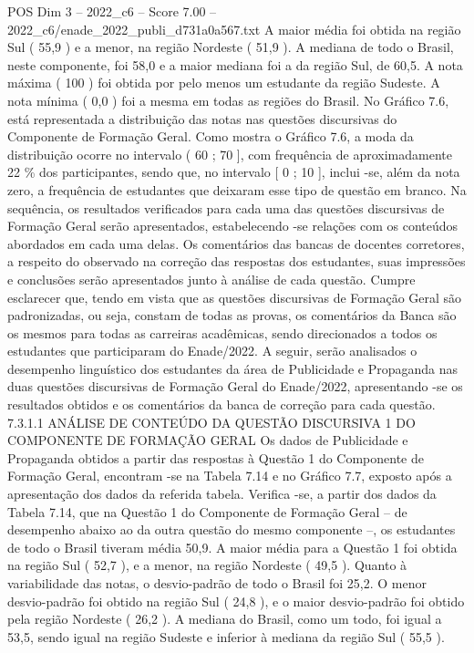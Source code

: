 \begin{textsample}{POS Dim 3 – 2022\_c6 – Score 7.00 – 2022\_c6/enade\_2022\_publi\_d731a0a567.txt}
A maior média foi obtida na região Sul ( 55,9 ) e a menor, na região Nordeste ( 51,9 ).
A mediana de todo o Brasil, neste componente, foi 58,0 e a maior mediana foi a da região Sul, de 60,5.
A nota máxima ( 100 ) foi obtida por pelo menos um estudante da região Sudeste.
A nota mínima ( 0,0 ) foi a mesma em todas as regiões do Brasil.
No Gráfico 7.6, está representada a distribuição das notas nas questões discursivas do Componente de Formação Geral.
Como mostra o Gráfico 7.6, a moda da distribuição ocorre no intervalo ( 60 ; 70 ], com frequência de aproximadamente 22 \% dos participantes, sendo que, no intervalo [ 0 ; 10 ], inclui -se, além da nota zero, a frequência de estudantes que deixaram esse tipo de questão em branco.
Na sequência, os resultados verificados para cada uma das questões discursivas de Formação Geral serão apresentados, estabelecendo -se relações com os conteúdos abordados em cada uma delas.
Os comentários das bancas de docentes corretores, a respeito do observado na correção das respostas dos estudantes, suas impressões e conclusões serão apresentados junto à análise de cada questão.
Cumpre esclarecer que, tendo em vista que as questões discursivas de Formação Geral são padronizadas, ou seja, constam de todas as provas, os comentários da Banca são os mesmos para todas as carreiras acadêmicas, sendo direcionados a todos os estudantes que participaram do Enade/2022.
A seguir, serão analisados o desempenho linguístico dos estudantes da área de Publicidade e Propaganda nas duas questões discursivas de Formação Geral do Enade/2022, apresentando -se os resultados obtidos e os comentários da banca de correção para cada questão. 7.3.1.1 ANÁLISE DE CONTEÚDO DA QUESTÃO DISCURSIVA 1 DO COMPONENTE DE FORMAÇÃO GERAL Os dados de Publicidade e Propaganda obtidos a partir das respostas à Questão 1 do Componente de Formação Geral, encontram -se na Tabela 7.14 e no Gráfico 7.7, exposto após a apresentação dos dados da referida tabela.
Verifica -se, a partir dos dados da Tabela 7.14, que na Questão 1 do Componente de Formação Geral – de desempenho abaixo ao da outra questão do mesmo componente –, os estudantes de todo o Brasil tiveram média 50,9.
A maior média para a Questão 1 foi obtida na região Sul ( 52,7 ), e a menor, na região Nordeste ( 49,5 ).
Quanto à variabilidade das notas, o desvio-padrão de todo o Brasil foi 25,2.
O menor desvio-padrão foi obtido na região Sul ( 24,8 ), e o maior desvio-padrão foi obtido pela região Nordeste ( 26,2 ).
A mediana do Brasil, como um todo, foi igual a 53,5, sendo igual na região Sudeste e inferior à mediana da região Sul ( 55,5 ).

\end{textsample}
